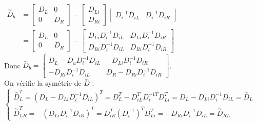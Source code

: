 \documentclass[12pt,a4paper]{article}
\begin{document}
\begin{sol}
		$\begin{aligned}
			\overset\sim D_b &= \left[\begin{matrix}
				D_L & 0 \\
				0 & D_R
			\end{matrix}\right] - \left[\begin{matrix}
				D_{Li} \\
				D_{Ri}
			\end{matrix}\right]\left[\begin{matrix}
				D_i^{-1}D_{iL} & D_i^{-1}D_{iR}
			\end{matrix}\right]\\
			&=\left[\begin{matrix}
				D_L & 0 \\
				0 & D_R
			\end{matrix}\right] - \left[\begin{matrix}
				D_{Li} D_i^{-1}D_{iL} & D_{Li} D_i^{-1}D_{iR} \\
				D_{Ri}D_i^{-1}D_{iL} & D_{Ri}D_i^{-1}D_{iR}
			\end{matrix}\right]
		\end{aligned}
		$\\
		Donc $\overset\sim D_b = \left[\begin{matrix}
			D_L - D_uD_i^{-1}D_{iL} & -D_{Li}D_i^{-1}D_{iR} \\
			-D_{Ri}D_i^{-1} D_{iL} & D_R-D_{Ri}D_i^{-1}D_{iR}
		\end{matrix}\right]$.\\
		On vérifie la symétrie de $\overset\sim D$ :\\
		$\begin{cases}
			\overset\sim D_L ^T = \left(D_L-D_{Li}D_i^{-1}D_{iL}\right)^T = D_L^T -D_{iL}^TD_i^{-1 T}D_{Li}^T = D_L-D_{Li}D_i^{-1}D_{iL} = \overset\sim D_L\\
			\overset\sim D_{LR}^T = -(D_{Li}D_i^{-1}D_{iR})^T = D_{iR}^T(D_i^{-1})^TD_{Li}^T = -D_{Ri}D_i^{-1}D_{iL} = \overset\sim D_{RL}
		\end{cases}$
		
	\end{sol}
	
\end{document}
